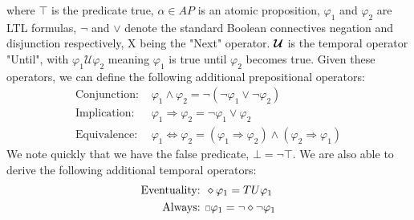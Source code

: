 where $\top$ is the predicate true, $\alpha \in AP$ is an atomic proposition, $\varphi_1$ and $\varphi_2$ are LTL formulas, $\neg$ and $\lor$ denote the standard Boolean connectives negation and disjunction respectively, X being the "Next" operator. $\bm{\mathcal{U}}$ is the temporal operator "Until", with $\varphi_1 \mathcal{U} \varphi_2$ meaning $\varphi_1$ is true until $\varphi_2$ becomes true. Given these operators, we can define the following additional prepositional operators:
\begin{align*}
    \text{Conjunction: }&  \varphi_1  \land \varphi_2 = \neg(\neg \varphi_1 \lor \neg \varphi_2) \\
    \text{Implication: }& \varphi_1 \Rightarrow \varphi_2 = \neg \varphi_1 \lor \varphi_2 \\
    \text{Equivalence: }& \varphi_1 \Leftrightarrow \varphi_2 = (\varphi_1 \Rightarrow \varphi_2) \land (\varphi_2 \Rightarrow \varphi_1)
\end{align*}
We note quickly that we have the false predicate, $\bot = \neg \top$.
We are also able to derive the following additional temporal operators:
\begin{align*}
    \text{Eventuality: }& \diamond \varphi_1 = T U \varphi_1 \\
    \text{Always: }& \ssquare \varphi_1 = \neg \diamond \neg \varphi_1
\end{align*}

